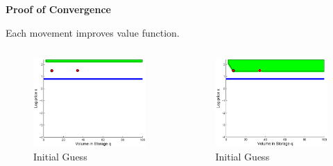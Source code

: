 \documentclass{beamer}
\begin{document}
\begin{frame}
{\bf Proof of Convergence}
\begin{Theorem}
Each movement improves value function.
\end{Theorem}
\begin{columns}
  \begin{figure}[hbt]
  \includegraphics[scale = 0.4]{0Converge.eps}
  \caption{Initial Guess}
  \end{figure}
  \begin{figure}[hbt]
  \includegraphics[scale = 0.4]{9Converge.eps}
  \caption{Initial Guess}
\end{figure}
\end{columns}

\end{frame}
\end{document}
